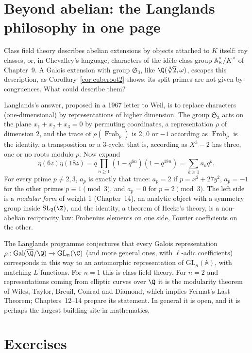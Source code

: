 \section{Beyond abelian: the Langlands philosophy in one page}

Class field theory describes abelian extensions by objects attached to $K$ itself: ray classes, or, in Chevalley's language, characters of the id\`ele
class group $\mathbb A_K^\times/K^\times$ of Chapter~9. A Galois extension with group $\mathfrak S_3$, like $\Q(\sqrt[3]2,\omega)$, escapes this description, as
Corollary~\ref{cor:cuberoot2} shows: its split primes are not given by congruences. What could describe them?

Langlands's answer, proposed in a 1967 letter to Weil, is to replace characters (one-dimensional) by representations of higher dimension. The group
$\mathfrak S_3$ acts on the plane $x_1+x_2+x_3=0$ by permuting coordinates, a representation $\rho$ of dimension $2$, and the trace of $\rho(\operatorname{Frob}_p)$ is
$2$, $0$ or $-1$ according as $\operatorname{Frob}_p$ is the identity, a transposition or a $3$-cycle, that is, according as $X^3-2$ has three, one or no roots
modulo $p$. Now expand
\[
\eta(6z)\eta(18z)=q\prod_{n\ge1}(1-q^{6n})(1-q^{18n})=\sum_{k\ge1}a_kq^k.
\]
For every prime $p\ne2,3$, $a_p$ is exactly that trace: $a_p=2$ if $p=x^2+27y^2$, $a_p=-1$ for the other primes $p\equiv1\pmod3$, and $a_p=0$ for $p\equiv2\pmod3$. The left side is a \emph{modular form} of weight $1$ (Chapter~14), an analytic object with a symmetry group inside
$\mathrm{SL}_2(\Z)$, and the identity, a theorem of Hecke's theory, is a non-abelian reciprocity law: Frobenius elements on one side, Fourier
coefficients on the other.

The Langlands programme conjectures that every Galois representation $\rho:\operatorname{Gal}(\overline{\Q}/\Q)\to\mathrm{GL}_n(\C)$ (and more general ones, with
$\ell$-adic coefficients) corresponds in this way to an automorphic representation of $\mathrm{GL}_n(\mathbb A)$, with matching $L$-functions. For $n=1$ this
is class field theory. For $n=2$ and representations coming from elliptic curves over $\Q$ it is the modularity theorem of Wiles, Taylor, Breuil,
Conrad and Diamond, which implies Fermat's Last Theorem; Chapters~12--14 prepare its statement. In general it is open, and it is perhaps the
largest building site in mathematics.

\section{Exercises}

